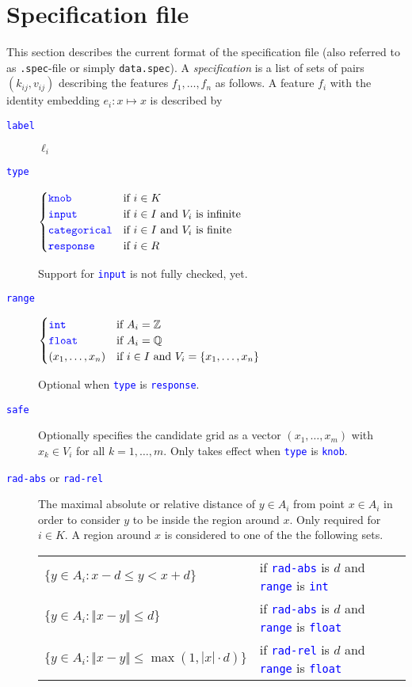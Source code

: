 \documentclass[a4paper,parskip=half]{scrartcl}
\newcommand*\spec[1]{\textcolor{blue}{\texttt{#1}}}
\begin{document}
\section{Specification file}
This section describes the current format of the specification file
(also referred to as \texttt{.spec}-file or simply \texttt{data.spec}).
A \emph{specification} is a list of sets of pairs $(k_{ij},v_{ij})$ describing
the features $f_1,\ldots,f_n$ as follows.
%
A feature $f_i$ with the identity embedding $e_i:x\mapsto x$ is described by
\begin{description}
\item[\spec{label}] $\ell_i$
\item[\spec{type}]
	$\begin{cases}
		\spec{knob}     & \text{if}~i\in K \\
		\spec{input}    & \text{if}~i\in I~\text{and}~V_i~\text{is infinite} \\
		\spec{categorical} & \text{if}~i\in I~\text{and}~V_i~\text{is finite} \\
		\spec{response} & \text{if}~i\in R
	\end{cases}$

	Support for \spec{input} is not fully checked, yet.
\item[\spec{range}]
	$\begin{cases}
		\spec{int} & \text{if}~A_i=\mathbb Z \\
		\spec{float} & \text{if}~A_i=\mathbb Q \\
		(x_1,\ldots,x_n) & \text{if}~i\in I~\text{and}~V_i=\{x_1,\ldots,x_n\}
	\end{cases}$

	Optional when \spec{type} is \spec{response}.
\item[\spec{safe}]
	Optionally specifies the candidate grid as a vector $(x_1,\ldots,x_m)$
	with $x_k\in V_i$ for all $k=1,\ldots,m$.
	Only takes effect when \spec{type} is \spec{knob}.
\item[\spec{rad-abs} or \spec{rad-rel}]
	The maximal absolute or relative distance of $y\in A_i$ from point $x\in A_i$
	in order to consider $y$ to be inside the region around $x$.
	Only required for $i\in K$.
	A region around $x$ is considered to one of the the following sets.
	\begin{center}
	\begin{tabular}{ll}
		$\{y\in A_i:x-d\leq y<x+d\}$ &
			if \spec{rad-abs} is $d$ and \spec{range} is \spec{int} \\
		$\{y\in A_i:\Vert x-y\Vert\leq d\}$ &
			if \spec{rad-abs} is $d$ and \spec{range} is \spec{float} \\
		$\{y\in A_i:\Vert x-y\Vert\leq\max(1,|x|\cdot d)\}$ &
			if \spec{rad-rel} is $d$ and \spec{range} is \spec{float} \\
	\end{tabular}
	\end{center}
\end{description}
\end{document}

